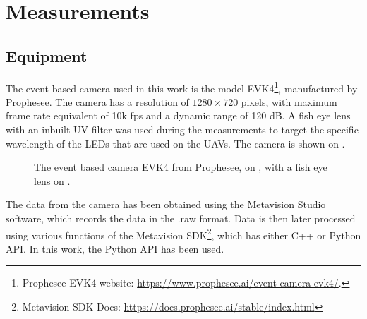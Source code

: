 
\chapter{Measurements\label{chap:measurements}}

\section{Equipment}

The event based camera used in this work is the model EVK4\footnote{Prophesee EVK4 website: \url{https://www.prophesee.ai/event-camera-evk4/}.}, manufactured by Prophesee. The camera has a resolution of 
$1280 \times 720$ pixels, with maximum frame rate equivalent of 10k fps and a dynamic range of 120 dB.
A fish eye lens with an inbuilt UV filter was used during the measurements to target the specific wavelength of the LEDs
that are used on the UAVs. The camera is shown on . 

\begin{figure}[htbp]
  \centering
  \caption{
The event based camera EVK4 from Prophesee, on , with a fish eye lens on .
}
  \label{fig:evk4}
\end{figure}

The data from the camera has been obtained using the Metavision Studio software, which records the data in the .raw format.
Data is then later processed using various functions of the Metavision SDK\footnote{Metavision SDK Docs: \url{https://docs.prophesee.ai/stable/index.html}},
which has either C++ or Python API. In this work, the Python API has been used.

